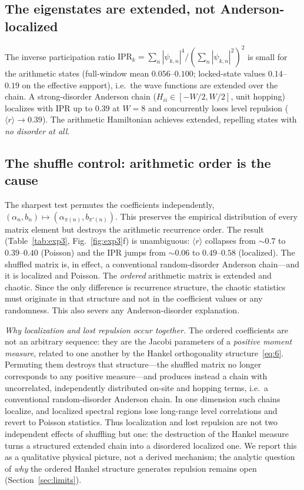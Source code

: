 \documentclass[aps,prx,reprint,floatfix]{revtex4-2}
\begin{document}
\subsection{The eigenstates are extended, not Anderson-localized}
\label{sec:e2}
The inverse participation ratio
$\mathrm{IPR}_k=\sum_n|\psi_{k,n}|^4/(\sum_n|\psi_{k,n}|^2)^2$ is small for
the arithmetic states (full-window mean $0.056$--$0.100$; locked-state
values $0.14$--$0.19$ on the effective support), i.e.\ the wave functions
are extended over the chain. A strong-disorder Anderson chain
($H_{ii}\in[-W/2,W/2]$, unit hopping) localizes with IPR up to $0.39$ at
$W=8$ and concurrently loses level repulsion ($\langle r\rangle\to0.39$).
The arithmetic Hamiltonian achieves extended, repelling states with
\emph{no disorder at all}.

\subsection{The shuffle control: arithmetic order is the cause}
\label{sec:shuffle}
The sharpest test permutes the coefficients independently,
$(\alpha_n,b_n)\mapsto(\alpha_{\pi(n)},b_{\pi'(n)})$. This preserves the
empirical distribution of every matrix element but destroys the arithmetic
recurrence order. The result (Table~\ref{tab:exp3}, Fig.~\ref{fig:exp3}f)
is unambiguous: $\langle r\rangle$ collapses from $\sim0.7$ to
$0.39$--$0.40$ (Poisson) and the IPR jumps from $\sim0.06$ to $0.49$--$0.58$
(localized). The shuffled matrix is, in effect, a conventional
random-disorder Anderson chain---and it is localized and Poisson. The
\emph{ordered} arithmetic matrix is extended and chaotic. Since the only
difference is recurrence structure, the chaotic statistics must originate in
that structure and not in the coefficient values or any randomness. This
also severs any Anderson-disorder explanation.

\noindent\emph{Why localization and lost repulsion occur together.} The
ordered coefficients are not an arbitrary sequence: they are the Jacobi
parameters of a \emph{positive moment measure}, related to one another by
the Hankel orthogonality structure~\eqref{eq:6}. Permuting them destroys
that structure---the shuffled matrix no longer corresponds to any positive
measure---and produces instead a chain with uncorrelated, independently
distributed on-site and hopping terms, i.e.\ a conventional random-disorder
Anderson chain. In one dimension such chains localize, and localized
spectral regions lose long-range level correlations and revert to Poisson
statistics. Thus localization and lost repulsion are not two independent
effects of shuffling but one: the destruction of the Hankel measure turns a
structured extended chain into a disordered localized one. We report this
as a qualitative physical picture, not a derived mechanism; the analytic
question of \emph{why} the ordered Hankel structure generates repulsion
remains open (Section~\ref{sec:limits}).
\end{document}
